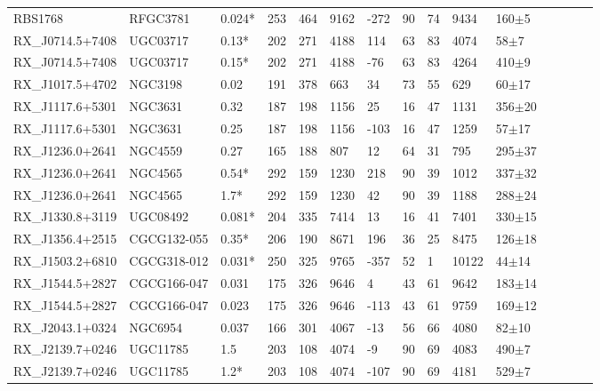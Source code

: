 \documentclass[iop]{emulateapj-rtx4}
\begin{document}
\begin{table}[ht]
\begin{center}
\begin{tabular}{l l l l l l l l l l l l l l l}
RBS1768  &  RFGC3781  &  0.024*  &  253  &  464  &  9162  &  -272  &  90  &  74  &  9434  &  160$\pm$5  \\
RX\_J0714.5+7408  &  UGC03717  &  0.13*  &  202  &  271  &  4188  &  114  &  63  &  83  &  4074  &  58$\pm$7  \\
RX\_J0714.5+7408  &  UGC03717  &  0.15*  &  202  &  271  &  4188  &  -76  &  63  &  83  &  4264  &  410$\pm$9  \\
RX\_J1017.5+4702  &  NGC3198  &  0.02  &  191  &  378  &  663  &  34  &  73  &  55  &  629  &  60$\pm$17  \\
RX\_J1117.6+5301  &  NGC3631  &  0.32  &  187  &  198  &  1156  &  25  &  16  &  47  &  1131  &  356$\pm$20  \\
RX\_J1117.6+5301  &  NGC3631  &  0.25  &  187  &  198  &  1156  &  -103  &  16  &  47  &  1259  &  57$\pm$17  \\
RX\_J1236.0+2641  &  NGC4559  &  0.27  &  165  &  188  &  807  &  12  &  64  &  31  &  795  &  295$\pm$37  \\
RX\_J1236.0+2641  &  NGC4565  &  0.54*  &  292  &  159  &  1230  &  218  &  90  &  39  &  1012  &  337$\pm$32  \\
RX\_J1236.0+2641  &  NGC4565  &  1.7*  &  292  &  159  &  1230  &  42  &  90  &  39  &  1188  &  288$\pm$24  \\
RX\_J1330.8+3119  &  UGC08492  &  0.081*  &  204  &  335  &  7414  &  13  &  16  &  41  &  7401  &  330$\pm$15  \\
RX\_J1356.4+2515  &  CGCG132-055  &  0.35*  &  206  &  190  &  8671  &  196  &  36  &  25  &  8475  &  126$\pm$18  \\
RX\_J1503.2+6810  &  CGCG318-012  &  0.031*  &  250  &  325  &  9765  &  -357  &  52  &  1  &  10122  &  44$\pm$14  \\
RX\_J1544.5+2827  &  CGCG166-047  &  0.031  &  175  &  326  &  9646  &  4  &  43  &  61  &  9642  &  183$\pm$14  \\
RX\_J1544.5+2827  &  CGCG166-047  &  0.023  &  175  &  326  &  9646  &  -113  &  43  &  61  &  9759  &  169$\pm$12  \\
RX\_J2043.1+0324  &  NGC6954  &  0.037  &  166  &  301  &  4067  &  -13  &  56  &  66  &  4080  &  82$\pm$10  \\
RX\_J2139.7+0246  &  UGC11785  &  1.5  &  203  &  108  &  4074  &  -9  &  90  &  69  &  4083  &  490$\pm$7  \\
RX\_J2139.7+0246  &  UGC11785  &  1.2*  &  203  &  108  &  4074  &  -107  &  90  &  69  &  4181  &  529$\pm$7  \\

\end{tabular}
\end{center}
\end{table}
\end{document}
